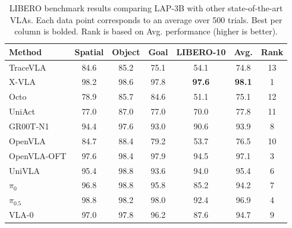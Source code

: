 \begin{table}[!h]
\centering
\footnotesize
\setlength{\tabcolsep}{4pt}
\caption{LIBERO benchmark results comparing LAP-3B with other state-of-the-art VLAs. Each data point corresponds to an average over 500 trials. Best per column is bolded. Rank is based on Avg. performance (higher is better).}
\begin{tabular}{l c c c c c c}
\toprule
Method & Spatial & Object & Goal & LIBERO-10 & Avg. & Rank \\
\midrule

TraceVLA \cite{zheng2025tracevlavisualtraceprompting} 
& 84.6 & 85.2 & 75.1 & 54.1 & 74.8 & 13 \\

X-VLA \cite{zheng2025xvlasoftpromptedtransformerscalable} 
& 98.2 & 98.6 & 97.8 & \textbf{97.6} & \textbf{98.1} & 1 \\

Octo \cite{octomodelteam2024octoopensourcegeneralistrobot} 
& 78.9 & 85.7 & 84.6 & 51.1 & 75.1 & 12 \\

UniAct \cite{zheng2025universalactionsenhancedembodied} 
& 77.0 & 87.0 & 77.0 & 70.0 & 77.8 & 11 \\

GR00T-N1 \cite{nvidia2025gr00tn1openfoundation} 
& 94.4 & 97.6 & 93.0 & 90.6 & 93.9 & 8 \\

OpenVLA \cite{kim2024openvlaopensourcevisionlanguageactionmodel} 
& 84.7 & 88.4 & 79.2 & 53.7 & 76.5 & 10 \\

OpenVLA-OFT \cite{kim2025finetuningvisionlanguageactionmodelsoptimizing} 
& 97.6 & 98.4 & 97.9 & 94.5 & 97.1 & 3 \\

UniVLA \cite{bu2025univlalearningacttaskcentric} 
& 95.4 & 98.8 & 93.6 & 94.0 & 95.4 & 6 \\

$\pi_0$ \cite{black2024pi0visionlanguageactionflowmodel} 
& 96.8 & 98.8 & 95.8 & 85.2 & 94.2 & 7 \\

$\pi_{0.5}$ \cite{intelligence2025pi05visionlanguageactionmodelopenworld} 
& 98.8 & 98.2 & 98.0 & 92.4 & 96.9 & 4 \\

VLA-0 \cite{goyal2025vla0buildingstateoftheartvlas} 
& 97.0 & 97.8 & 96.2 & 87.6 & 94.7 & 9 \\


\end{tabular}
\end{table}
